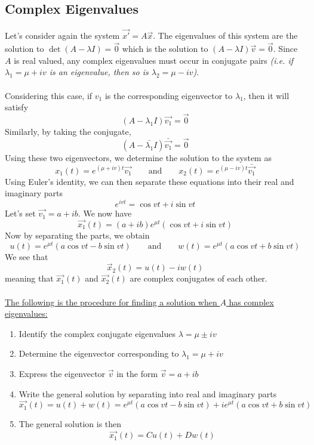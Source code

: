 \documentclass[11pt]{article}
\begin{document}
\subsection{Complex Eigenvalues}
Let's consider again the system $\vec{x'} = A\vec{x}$. The eigenvalues of this system are the solution to $\det{(A-\lambda I)} = \vec{0}$ which is the solution to $(A-\lambda I)\vec{v} = \vec{0}$. Since $A$ is real valued, any complex eigenvalues must occur in conjugate pairs \textit{(i.e. if $\lambda_1 = \mu + iv$ is an eigenvalue, then so is $\lambda_2 = \mu - iv$)}.
\\ \\ Considering this case, if $v_1$ is the corresponding eigenvector to $\lambda_1$, then it will satisfy
$$ (A-\lambda_1 I)\vec{v_1} = \vec{0}$$ Similarly, by taking the conjugate, $$ (A-\bar{\lambda_1} I)\bar{\vec{v_1}} = \vec{0}$$
Using these two eigenvectors, we determine the solution to the system as 
$$ x_1(t)= e^{(\mu +iv)t}\vec{v_1} \quad \quad \text{and} \quad \quad x_2(t)= e^{(\mu -iv)t}\bar{\vec{v_1}}$$
Using Euler's identity, we can then separate these equations into their real and imaginary parts
$$e^{ivt} = \cos{vt} + i\sin{vt}$$
Let's set $\vec{v_1} = a + ib$. We now have
$$\vec{x_1}(t) = (a+ib)e^{\mu t}(\cos{vt} + i\sin{vt})$$
Now by separating the parts, we obtain
$$u(t) = e^{\mu t}(a\cos{vt} - b\sin{vt}) \quad \quad \text{and} \quad \quad w(t) = e^{\mu t}(a\cos{vt} + b\sin{vt})$$
We see that $$\vec{x}_2(t) = u(t) - iw(t)$$ meaning that $\vec{x_1}(t)$ and $\vec{x_2}(t)$ are complex conjugates of each other. \\ \\ \underline{The following is the procedure for finding a solution when $A$ has complex eigenvalues:}
\begin{enumerate}
\item Identify the complex conjugate eigenvalues $\lambda = \mu \pm iv$ 
\item Determine the eigenvector corresponding to $\lambda_1 = \mu + iv$
\item Express the eigenvector $\vec{v}$ in the form $\vec{v} = a+ib$
\item Write the general solution by separating into real and imaginary parts $$\vec{x_1}(t) = u(t) + w(t) = e^{\mu t}(a\cos{vt} - b\sin{vt})+ ie^{\mu t}(a\cos{vt} + b\sin{vt})$$
\item The general solution is then $$\vec{x_1}(t) = Cu(t) + Dw(t)$$

\end{enumerate}
\end{document}
